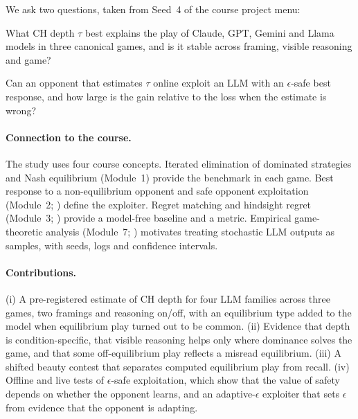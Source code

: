 \documentclass[11pt]{article}
\begin{document}
We ask two questions, taken from Seed~4 of the course project menu:
\begin{description}[leftmargin=0pt,labelindent=0pt]
\item[RQ1 (depth).] What CH depth $\tau$ best explains the play of Claude, GPT, Gemini and Llama models in three canonical games, and is it stable across framing, visible reasoning and game?
\item[RQ2 (exploitation).] Can an opponent that estimates $\tau$ online exploit an LLM with an $\epsilon$-safe best response, and how large is the gain relative to the loss when the estimate is wrong?
\end{description}

\paragraph{Connection to the course.} The study uses four course concepts. Iterated elimination of dominated strategies and Nash equilibrium (Module~1) provide the benchmark in each game. Best response to a non-equilibrium opponent and safe opponent exploitation (Module~2; \citealp{ganzfried2015}) define the exploiter. Regret matching and hindsight regret (Module~3; \citealp{hart2000}) provide a model-free baseline and a metric. Empirical game-theoretic analysis (Module~7; \citealp{wellman2006}) motivates treating stochastic LLM outputs as samples, with seeds, logs and confidence intervals.

\paragraph{Contributions.}
(i) A pre-registered estimate of CH depth for four LLM families across three games, two framings and reasoning on/off, with an equilibrium type added to the model when equilibrium play turned out to be common. (ii) Evidence that depth is condition-specific, that visible reasoning helps only where dominance solves the game, and that some off-equilibrium play reflects a misread equilibrium. (iii) A shifted beauty contest that separates computed equilibrium play from recall. (iv) Offline and live tests of $\epsilon$-safe exploitation, which show that the value of safety depends on whether the opponent learns, and an adaptive-$\epsilon$ exploiter that sets $\epsilon$ from evidence that the opponent is adapting.
\end{document}
